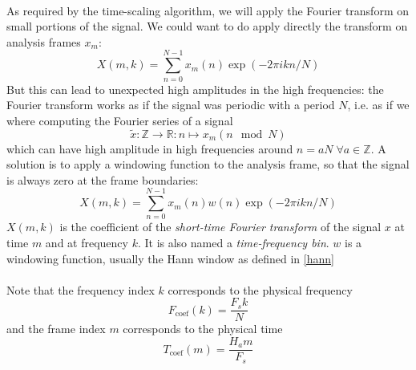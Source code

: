 \documentclass[letterpaper]{article}
\begin{document}
\paragraph{}
As required by the time-scaling algorithm, we will apply the Fourier transform
on small portions of the signal. We could want to do apply directly the
transform on analysis frames \(x_m\):
\begin{equation*}
X(m,k)=\sum_{n=0}^{N-1}x_m(n)\exp(-2\pi ikn/N)
\end{equation*}
But this can lead to unexpected high amplitudes in the high frequencies:
the Fourier transform works as if the signal was periodic with a period \(N\),
i.e. as if we where computing the Fourier series of a signal
\begin{equation}
\tilde x:\mathbb{Z}\to\mathbb{R}:n\mapsto x_m(n\mod N)
\end{equation}
which can have high amplitude in high frequencies around
\(n=aN\;\forall a\in\mathbb{Z}\).
A solution is to apply a windowing function to the analysis frame, so that the
signal is always zero at the frame boundaries:
\begin{equation}
    X(m,k) = \sum_{n=0}^{N-1}x_m(n)w(n)\exp(-2\pi ikn/N)
\end{equation}
\(X(m,k)\) is the coefficient of the \emph{short-time Fourier transform} of
the signal \(x\) at time \(m\) and at frequency \(k\). It is also named a
\emph{time-frequency bin}. \(w\) is a windowing function, usually the Hann
window as defined in \eqref{hann}

\paragraph{}
Note that the frequency index \(k\) corresponds to the physical frequency
\begin{equation}
		\label{frequency_index}
    F_{\text{coef}}(k) = \frac{F_s k}{N}
\end{equation}
and the frame index \(m\) corresponds to the physical time
\begin{equation}
    T_{\text{coef}}(m) = \frac{H_a m}{F_s}
\end{equation}
\end{document}
